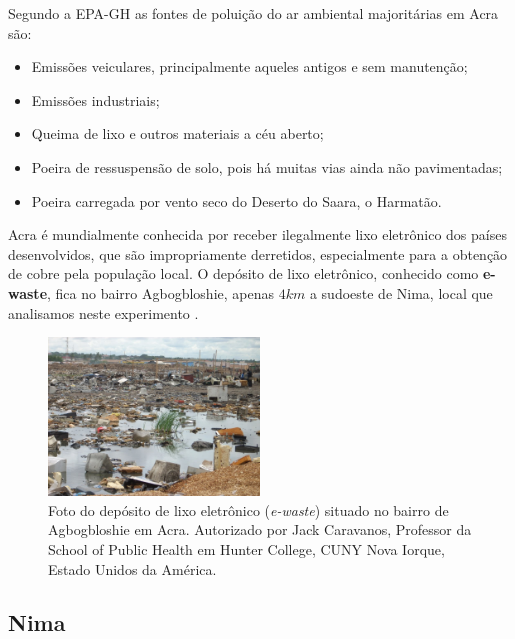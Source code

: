 
Segundo a EPA-GH \citep{epa2015} as fontes de poluição do ar ambiental 
majoritárias em Acra são:

\begin{itemize}
 \item Emissões veiculares, principalmente aqueles antigos e sem 
       manutenção;
 \item Emissões industriais;
 \item Queima de lixo e outros materiais a céu aberto;
 \item Poeira de ressuspensão de solo, pois há muitas vias ainda não pavimentadas;
 \item Poeira carregada por vento seco do Deserto do Saara, o Harmatão.
\end{itemize}

Acra é mundialmente conhecida por receber ilegalmente lixo 
eletrônico dos países desenvolvidos, que são impropriamente derretidos, 
especialmente para a obtenção de cobre pela população local. 
O depósito de lixo eletrônico, conhecido como \textbf{e-waste}, 
fica no bairro Agbogbloshie, apenas $4 km$ a sudoeste de Nima, 
local que analisamos neste experimento \citep{asampong2015}.

\begin{figure}[H]
  \centering
  \includegraphics[width=0.5\textwidth]{../inputs/images/ewaste_jack_caravano.jpg}
  \caption{Foto do depósito de lixo eletrônico (\textit{e-waste}) situado no bairro 
           de Agbogbloshie em Acra. Autorizado por Jack Caravanos, 
           Professor da School of Public Health em Hunter College, CUNY
           Nova Iorque, Estado Unidos da América. \label{fig:ewaste}}
\end{figure}

\subsection{Nima}

